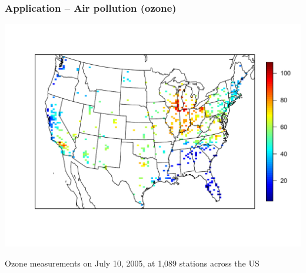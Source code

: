 \documentclass{beamer}
\renewcommand{\bs}{ \mbox{\boldmath s}}
\newcommand{\bit}{\begin{itemize}}
\newcommand{\eit}{\end{itemize}}
\begin{document}
\begin{frame}\frametitle{Application -- Air pollution (ozone)}
 \begin{center}
  \includegraphics[width=0.8\linewidth, trim={0, 3em, 0, 0}]{plots/ozone-10jul-us}

  Ozone measurements on July 10, 2005, at 1,089 stations across the US
 \end{center}
\end{frame}








\end{document}
